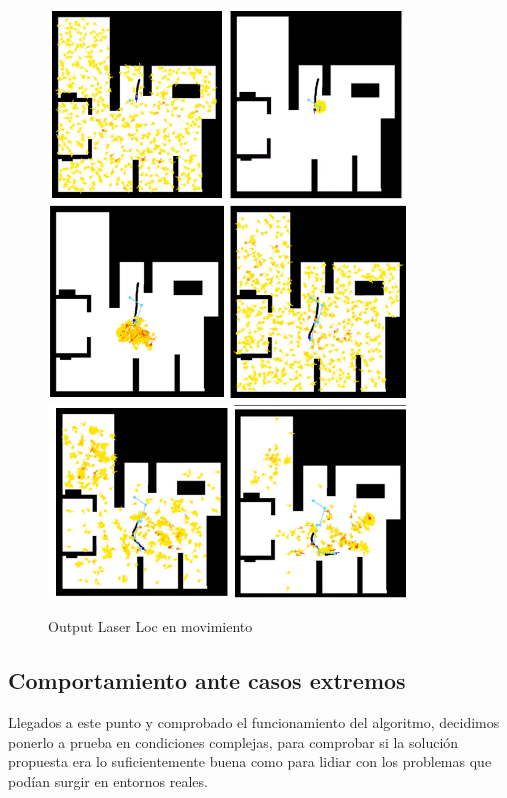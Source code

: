 \begin{figure}[H]
	\begin{center}
		\includegraphics[width=0.850\textwidth]{figures/lloutputmov1.png}
		\includegraphics[width=0.850\textwidth]{figures/lloutputmov2.png}
		\includegraphics[width=0.850\textwidth]{figures/lloutputmov3.png}
		\caption{Output Laser Loc en movimiento}
		\label{fig.outputllmov}
		\end{center}
\end{figure}

\subsection{Comportamiento ante casos extremos}
Llegados a este punto y comprobado el funcionamiento del algoritmo, decidimos ponerlo a prueba en condiciones complejas, para comprobar si la solución propuesta era lo suficientemente buena como para lidiar con los problemas que podían surgir en entornos reales.

